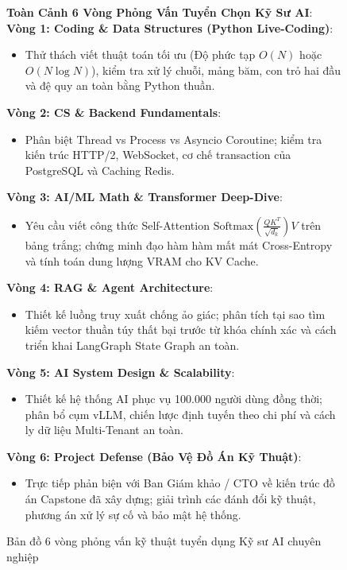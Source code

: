 \begin{figure}[htbp]
\centering
\begin{tcolorbox}[colback=boxbg,colframe=primarycolor,width=0.95\textwidth,arc=2pt]
\small
\textbf{Toàn Cảnh 6 Vòng Phỏng Vấn Tuyển Chọn Kỹ Sư AI}:\\[0.2cm]
\textbf{Vòng 1: Coding \& Data Structures (Python Live-Coding)}:
\begin{itemize}
  \item Thử thách viết thuật toán tối ưu (Độ phức tạp $O(N)$ hoặc $O(N \log N)$), kiểm tra xử lý chuỗi, mảng băm, con trỏ hai đầu và đệ quy an toàn bằng Python thuần.
\end{itemize}
\textbf{Vòng 2: CS \& Backend Fundamentals}:
\begin{itemize}
  \item Phân biệt Thread vs Process vs Asyncio Coroutine; kiểm tra kiến trúc HTTP/2, WebSocket, cơ chế transaction của PostgreSQL và Caching Redis.
\end{itemize}
\textbf{Vòng 3: AI/ML Math \& Transformer Deep-Dive}:
\begin{itemize}
  \item Yêu cầu viết công thức Self-Attention $\text{Softmax}\left(\frac{QK^T}{\sqrt{d_k}}\right)V$ trên bảng trắng; chứng minh đạo hàm hàm mất mát Cross-Entropy và tính toán dung lượng VRAM cho KV Cache.
\end{itemize}
\textbf{Vòng 4: RAG \& Agent Architecture}:
\begin{itemize}
  \item Thiết kế luồng truy xuất chống ảo giác; phân tích tại sao tìm kiếm vector thuần túy thất bại trước từ khóa chính xác và cách triển khai LangGraph State Graph an toàn.
\end{itemize}
\textbf{Vòng 5: AI System Design \& Scalability}:
\begin{itemize}
  \item Thiết kế hệ thống AI phục vụ 100.000 người dùng đồng thời; phân bổ cụm vLLM, chiến lược định tuyến theo chi phí và cách ly dữ liệu Multi-Tenant an toàn.
\end{itemize}
\textbf{Vòng 6: Project Defense (Bảo Vệ Đồ Án Kỹ Thuật)}:
\begin{itemize}
  \item Trực tiếp phản biện với Ban Giám khảo / CTO về kiến trúc đồ án Capstone đã xây dựng; giải trình các đánh đổi kỹ thuật, phương án xử lý sự cố và bảo mật hệ thống.
\end{itemize}
\end{tcolorbox}
\caption{Bản đồ 6 vòng phỏng vấn kỹ thuật tuyển dụng Kỹ sư AI chuyên nghiệp}
\label{fig:career-interview-roadmap}
\end{figure}

